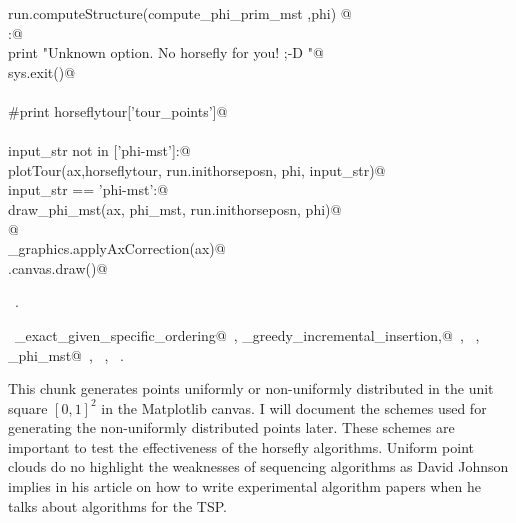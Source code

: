 \documentclass[11.5pt]{report}
\begin{document}
\begin{flushleft}
\begin{list}{}{}
\mbox{}\verb@             run.computeStructure(compute_phi_prim_mst ,phi)     @\\
\mbox{}\verb@else:@\\
\mbox{}\verb@      print "Unknown option. No horsefly for you! ;-D "@\\
\mbox{}\verb@      sys.exit()@\\
\mbox{}\verb@@\\
\mbox{}\verb@#print horseflytour['tour_points']@\\
\mbox{}\verb@@\\
\mbox{}\verb@if input_str not in ['phi-mst']:@\\
\mbox{}\verb@     plotTour(ax,horseflytour, run.inithorseposn, phi, input_str)@\\
\mbox{}\verb@elif input_str == 'phi-mst':@\\
\mbox{}\verb@     draw_phi_mst(ax, phi_mst, run.inithorseposn, phi)@\\
\mbox{}\verb@     @\\
\mbox{}\verb@utils_graphics.applyAxCorrection(ax)@\\
\mbox{}\verb@fig.canvas.draw()@\\
\mbox{}\verb@@{\NWsep}
\end{list}
\vspace{-1.5ex}
\footnotesize
\begin{list}{}{\setlength{\itemsep}{-\parsep}\setlength{\itemindent}{-\leftmargin}}
\item \NWtxtMacroRefIn\ .
\item \NWtxtIdentsUsed\nobreak\  \verb@algo_exact_given_specific_ordering@\nobreak\ , \verb@algo_greedy_incremental_insertion,@\nobreak\ , \verb@computeStructure@\nobreak\ , \verb@draw_phi_mst@\nobreak\ , \verb@getTour@\nobreak\ , \verb@plotTour@\nobreak\ .
\item{}
\end{list}
\vspace{4ex}
\end{flushleft}

\vspace{-0.8cm}\newchunk This chunk generates points uniformly or non-uniformly distributed in the 
unit square $[0,1]^2$ in the Matplotlib canvas. I will document the schemes used for 
generating the non-uniformly distributed points later. These schemes are important to test the effectiveness of 
the horsefly algorithms. Uniform point clouds do no highlight the weaknesses of 
sequencing algorithms as David Johnson implies in his article on how to write 
experimental algorithm papers when he talks about algorithms for the TSP. 
\end{document}
